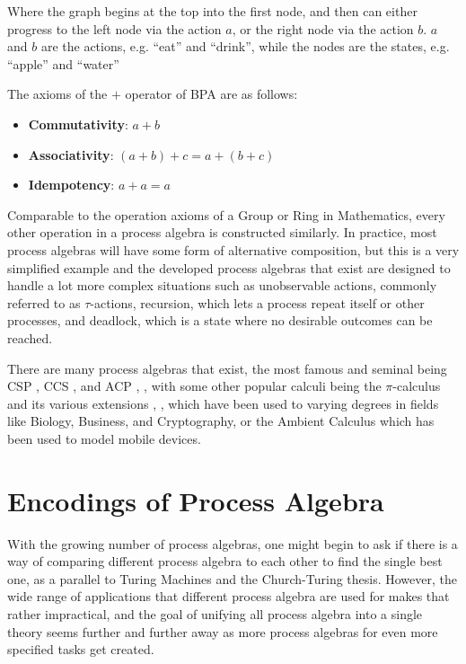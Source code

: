 \documentclass[logo,bsc,singlespacing,parskip,online]{infthesis}
\begin{document}
Where the graph begins at the top into the first node, and then can either progress to the left node via the action $a$, or the right node via the action $b$. $a$ and $b$ are the actions, e.g. ``eat'' and ``drink'', while the nodes are the states, e.g. ``apple'' and ``water''

The axioms of the $+$ operator of BPA are as follows:
\begin{itemize}
    \item \textbf{Commutativity}: $a + b$
    \item \textbf{Associativity}: $(a + b) + c = a + (b + c)$
    \item \textbf{Idempotency}: $a + a = a$
\end{itemize}
Comparable to the operation axioms of a Group or Ring in Mathematics, every other operation in a process algebra is constructed similarly. In practice, most process algebras will have some form of alternative composition, but this is a very simplified example and the developed process algebras that exist are designed to handle a lot more complex situations such as unobservable actions, commonly referred to as $\tau$-actions, recursion, which lets a process repeat itself or other processes, and deadlock, which is a state where no desirable outcomes can be reached.

There are many process algebras that exist, the most famous and seminal being CSP \citep{brookesTheoryCommunicatingSequential1984}, CCS \citep{milnerCalculusCommunicatingSystems1980}, and ACP \citep{bergstraProcessAlgebraSynchronous1984}, \citep{bergstraACPtUniversalAxiom1989}, with some other popular calculi being the $\pi$-calculus and its various extensions  \citep{MILNER19921}, \citep{parrowFusionCalculusExpressiveness1998}, \citep{abadiCalculusCryptographicProtocols1999} which have been used to varying degrees in fields like Biology, Business, and Cryptography, or the Ambient Calculus \citep{cardelliMobileAmbients1998} which has been used to model mobile devices.

\section{Encodings of Process Algebra}

With the growing number of process algebras, one might begin to ask if there is a way of comparing different process algebra to each other to find the single best one, as a parallel to Turing Machines and the Church-Turing thesis. However, the wide range of applications that different process algebra are used for makes that rather impractical, and the goal of unifying all process algebra into a single theory seems further and further away as more process algebras for even more specified tasks get created.
\end{document}
